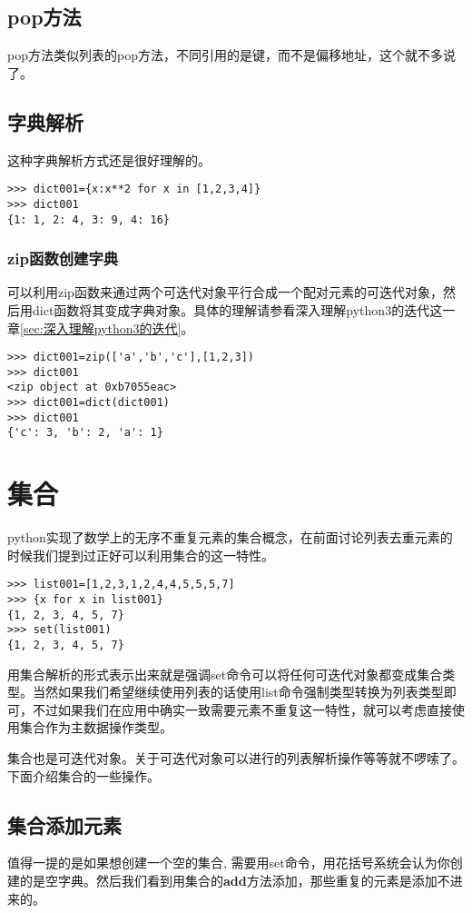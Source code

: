 \documentclass[12pt,oneside]{book}
\begin{document}
\begin{common-format}
\subsection{pop方法}
pop方法类似列表的pop方法，不同引用的是键，而不是偏移地址，这个就不多说了。



\subsection{字典解析}
\label{sec:字典解析}
这种字典解析方式还是很好理解的。
\begin{Verbatim}
>>> dict001={x:x**2 for x in [1,2,3,4]}
>>> dict001
{1: 1, 2: 4, 3: 9, 4: 16}
\end{Verbatim}

\subsubsection{zip函数创建字典}
可以利用zip函数来通过两个可迭代对象平行合成一个配对元素的可迭代对象，然后用dict函数将其变成字典对象。具体的理解请参看深入理解python3的迭代这一章\ref{sec:深入理解python3的迭代}。
\begin{Verbatim}
>>> dict001=zip(['a','b','c'],[1,2,3])
>>> dict001
<zip object at 0xb7055eac>
>>> dict001=dict(dict001)
>>> dict001
{'c': 3, 'b': 2, 'a': 1}
\end{Verbatim}




\section{集合}
\label{sec:集合}
python实现了数学上的无序不重复元素的集合概念，在前面讨论列表去重元素的时候我们提到过正好可以利用集合的这一特性。

\begin{Verbatim}
>>> list001=[1,2,3,1,2,4,4,5,5,5,7]
>>> {x for x in list001}
{1, 2, 3, 4, 5, 7}
>>> set(list001)
{1, 2, 3, 4, 5, 7}
\end{Verbatim}
用集合解析的形式表示出来就是强调set命令可以将任何可迭代对象都变成集合类型。当然如果我们希望继续使用列表的话使用list命令强制类型转换为列表类型即可，不过如果我们在应用中确实一致需要元素不重复这一特性，就可以考虑直接使用集合作为主数据操作类型。

集合也是可迭代对象。关于可迭代对象可以进行的列表解析操作等等就不啰嗦了。下面介绍集合的一些操作。

\subsection{集合添加元素}
值得一提的是如果想创建一个空的集合, 需要用set命令，用花括号{}系统会认为你创建的是空字典。然后我们看到用集合的\textbf{add}方法添加，那些重复的元素是添加不进来的。


\end{common-format}
\end{document}
